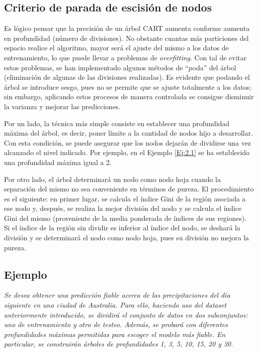 \documentclass[12pt,twoside]{article}
\begin{document}
\subsection{Criterio de parada de escisión de nodos}
Es lógico pensar que la precisión de un árbol CART aumenta conforme aumenta en profundidad (número de divisiones). No obstante cuantas más particiones del espacio realice el algoritmo, mayor será el ajuste del mismo a los datos de entrenamiento, lo que puede llevar a problemas de \textit{overfitting}. Con tal de evitar estos problemas, se han implementado algunos métodos de ``poda'' del árbol (eliminación de algunas de las divisiones realizadas). Es evidente que podando el árbol se introduce sesgo, pues no se permite que se ajuste totalmente a los datos; sin embargo, aplicando estos procesos de manera controlada se consigue disminuir la varianza y mejorar las predicciones.

Por un lado, la técnica más simple consiste en establecer una profundidad máxima del árbol, es decir, poner límite a la cantidad de nodos hijo a desarrollar. Con esta condición, se puede asegurar que los nodos dejarán de dividirse una vez alcanzado el nivel indicado. Por ejemplo, en el Ejemplo \ref{Ej:2.1} se ha establecido una profundidad máxima igual a 2.

Por otro lado, el árbol determinará un nodo como nodo hoja cuando la separación del mismo no sea conveniente en términos de pureza. El procedimiento es el siguiente: en primer lugar, se calcula el índice Gini de la región asociada a ese nodo y, después, se realiza la mejor división del nodo y se calcula el índice Gini del mismo (proveniente de la media ponderada de índices de sus regiones). Si el índice de la región sin dividir es inferior al índice del nodo, se deshará la división y se determinará el nodo como nodo hoja, pues su división no mejora la pureza.





\subsection{Ejemplo} \label{ex:CART}
\emph{Se desea obtener una predicción fiable acerca de las precipitaciones del día siguiente en una ciudad de Australia. Para ello, haciendo uso del dataset anteriormente introducido, se dividirá el conjunto de datos en dos subconjuntos: uno de entrenamiento y otro de testeo. Además, se probará con diferentes profundidades máximas permitidas para escoger el modelo más fiable. En particular, se construirán árboles de profundidades 1, 3, 5, 10, 15, 20 y 30.}
\end{document}

